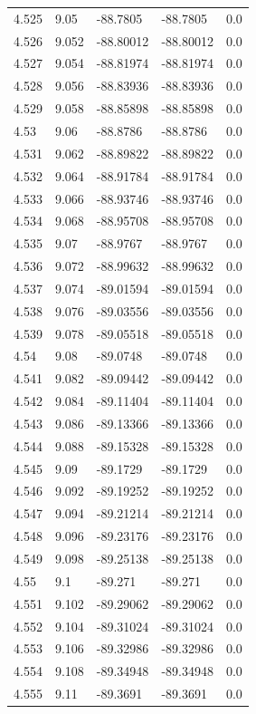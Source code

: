\begin{tabular}{lllll}
4.525 & 9.05 & -88.7805 & -88.7805 & 0.0 \\
4.526 & 9.052 & -88.80012 & -88.80012 & 0.0 \\
4.527 & 9.054 & -88.81974 & -88.81974 & 0.0 \\
4.528 & 9.056 & -88.83936 & -88.83936 & 0.0 \\
4.529 & 9.058 & -88.85898 & -88.85898 & 0.0 \\
4.53 & 9.06 & -88.8786 & -88.8786 & 0.0 \\
4.531 & 9.062 & -88.89822 & -88.89822 & 0.0 \\
4.532 & 9.064 & -88.91784 & -88.91784 & 0.0 \\
4.533 & 9.066 & -88.93746 & -88.93746 & 0.0 \\
4.534 & 9.068 & -88.95708 & -88.95708 & 0.0 \\
4.535 & 9.07 & -88.9767 & -88.9767 & 0.0 \\
4.536 & 9.072 & -88.99632 & -88.99632 & 0.0 \\
4.537 & 9.074 & -89.01594 & -89.01594 & 0.0 \\
4.538 & 9.076 & -89.03556 & -89.03556 & 0.0 \\
4.539 & 9.078 & -89.05518 & -89.05518 & 0.0 \\
4.54 & 9.08 & -89.0748 & -89.0748 & 0.0 \\
4.541 & 9.082 & -89.09442 & -89.09442 & 0.0 \\
4.542 & 9.084 & -89.11404 & -89.11404 & 0.0 \\
4.543 & 9.086 & -89.13366 & -89.13366 & 0.0 \\
4.544 & 9.088 & -89.15328 & -89.15328 & 0.0 \\
4.545 & 9.09 & -89.1729 & -89.1729 & 0.0 \\
4.546 & 9.092 & -89.19252 & -89.19252 & 0.0 \\
4.547 & 9.094 & -89.21214 & -89.21214 & 0.0 \\
4.548 & 9.096 & -89.23176 & -89.23176 & 0.0 \\
4.549 & 9.098 & -89.25138 & -89.25138 & 0.0 \\
4.55 & 9.1 & -89.271 & -89.271 & 0.0 \\
4.551 & 9.102 & -89.29062 & -89.29062 & 0.0 \\
4.552 & 9.104 & -89.31024 & -89.31024 & 0.0 \\
4.553 & 9.106 & -89.32986 & -89.32986 & 0.0 \\
4.554 & 9.108 & -89.34948 & -89.34948 & 0.0 \\
4.555 & 9.11 & -89.3691 & -89.3691 & 0.0 \\

\end{tabular}
